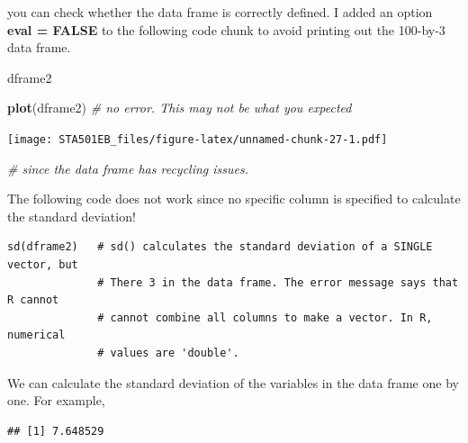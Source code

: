 \documentclass[
]{book}
\newenvironment{Shaded}{\begin{snugshade}}{\end{snugshade}}
\newcommand{\CommentTok}[1]{\textcolor[rgb]{0.56,0.35,0.01}{\textit{#1}}}
\newcommand{\FunctionTok}[1]{\textcolor[rgb]{0.13,0.29,0.53}{\textbf{#1}}}
\newcommand{\NormalTok}[1]{#1}
\newcommand{\SpecialCharTok}[1]{\textcolor[rgb]{0.81,0.36,0.00}{\textbf{#1}}}
\begin{document}
you can check whether the data frame is correctly defined. I added an option \textbf{eval = FALSE} to the following code chunk to avoid printing out the 100-by-3 data frame.

\begin{Shaded}
\begin{Highlighting}[]
\NormalTok{dframe2}
\end{Highlighting}
\end{Shaded}

\begin{Shaded}
\begin{Highlighting}[]
\FunctionTok{plot}\NormalTok{(dframe2)   }\CommentTok{\# no error. This may not be what you expected }
\end{Highlighting}
\end{Shaded}

\texttt{[image: STA501EB\_files/figure-latex/unnamed-chunk-27-1.pdf]}

\begin{Shaded}
\begin{Highlighting}[]
                \CommentTok{\# since the data frame has recycling issues.}
\end{Highlighting}
\end{Shaded}

The following code does not work since no specific column is specified to calculate the standard deviation!

\begin{verbatim}
sd(dframe2)   # sd() calculates the standard deviation of a SINGLE vector, but
              # There 3 in the data frame. The error message says that R cannot
              # cannot combine all columns to make a vector. In R, numerical 
              # values are 'double'.
\end{verbatim}

We can calculate the standard deviation of the variables in the data frame one by one. For example,

\begin{Shaded}
\end{Shaded}

\begin{verbatim}
## [1] 7.648529
\end{verbatim}
\end{document}

